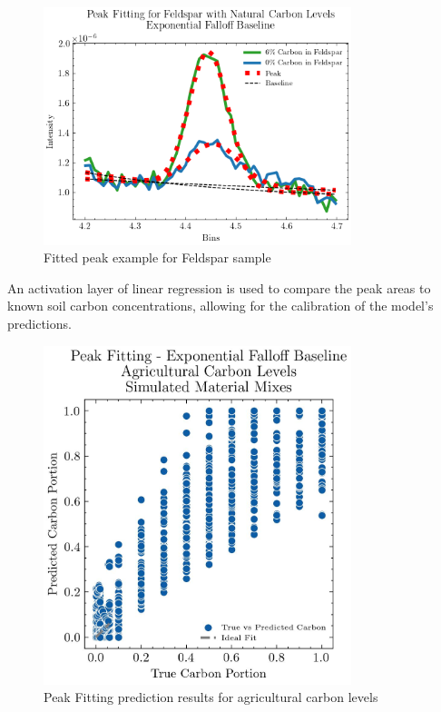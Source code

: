 \documentclass[review]{elsarticle}
\begin{document}
\begin{figure}[H]
\centering
\includegraphics[width=0.8\textwidth]{../Figures/Analysis/peak_fitting_feldspar.png}
\caption{Fitted peak example for Feldspar sample}
\label{fig:peak_fitting}
\end{figure}

An activation layer of linear regression is used to compare the peak areas to known soil carbon concentrations, allowing for the calibration of the model's predictions.

\begin{figure}[H]
\centering
\includegraphics[width=0.8\textwidth]{../Figures/Analysis/PF_Exponential_Falloff_Agricultural_Carbon_Levels.jpg}
\caption{Peak Fitting prediction results for agricultural carbon levels}
\label{fig:peak_fitting_results}
\end{figure}
\end{document}
